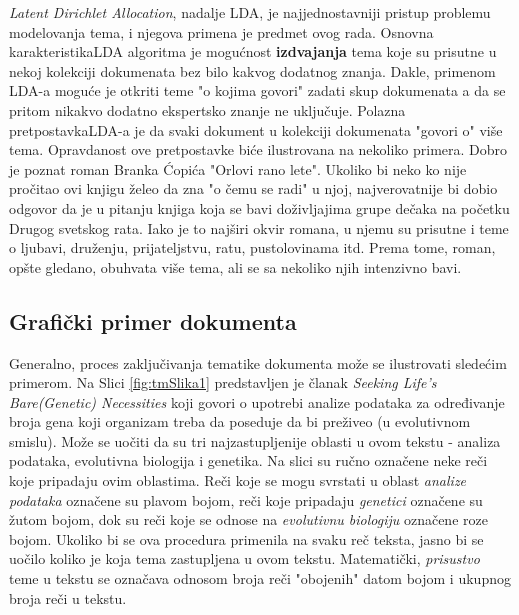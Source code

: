 \documentclass[12pt,a4paper]{article}
\begin{document}
\begin{multicols}{2}
{\lat \textit{Latent Dirichlet Allocation}}, nadalje {\lat LDA}, je najjednostavniji pristup problemu modelovanja tema, i njegova primena je predmet ovog rada.
Osnovna karakteristika{\lat LDA } algoritma je mogu\' cnost \textbf{izdvajanja} tema koje su prisutne u nekoj kolekciji dokumenata bez bilo kakvog dodatnog znanja. Dakle, primenom {\lat LDA}-a mogu\' ce je otkriti teme "o kojima govori" zadati skup dokumenata a da se pritom nikakvo dodatno ekspertsko znanje ne uklju\v cuje.
Polazna pretpostavka{\lat LDA}-a je da svaki dokument u kolekciji dokumenata "govori o" vi\v se tema. Opravdanost ove pretpostavke bi\' ce ilustrovana na nekoliko primera.
Dobro je poznat roman Branka \' Copi\' ca "Orlovi rano lete". Ukoliko bi neko ko nije pro\v citao ovi knjigu \v zeleo da zna "o \v cemu se radi" u njoj, najverovatnije bi dobio odgovor da je u pitanju knjiga koja se bavi do\v zivljajima grupe de\v caka na po\v cetku Drugog svetskog rata. Iako je to naj\v siri okvir romana, u njemu su prisutne i teme o ljubavi, dru\v zenju, prijateljstvu, ratu, pustolovinama itd. Prema tome, roman, op\v ste gledano, obuhvata vi\v se tema, ali se sa nekoliko njih intenzivno bavi.
\end{multicols}

\subsection{Grafi\v cki primer dokumenta}
Generalno, proces zaklju\v civanja tematike dokumenta mo\v ze se ilustrovati slede\' cim primerom.
Na Slici \ref{fig:tmSlika1} predstavljen je \v clanak {\lat \textit{Seeking Life's Bare(Genetic) Necessities}} koji govori o upotrebi analize podataka za određivanje broja gena koji organizam treba da poseduje da bi pre\v ziveo (u evolutivnom smislu). Mo\v ze se uo\v citi da su tri najzastupljenije oblasti u ovom tekstu - analiza podataka, evolutivna biologija i genetika. Na slici su ru\v cno ozna\v cene neke re\v ci koje pripadaju ovim oblastima. Re\v ci koje se mogu svrstati u oblast \textit{analize podataka} ozna\v cene su plavom bojom, re\v ci koje pripadaju \textit{genetici} ozna\v cene su \v zutom bojom, dok su re\v ci koje se odnose na \textit{evolutivnu biologiju} ozna\v cene roze bojom. Ukoliko bi se ova procedura primenila na svaku re\v c teksta, jasno bi se uo\v cilo koliko je koja tema zastupljena u ovom tekstu. Matemati\v cki, \textit{prisustvo} teme u tekstu se ozna\v cava odnosom broja re\v ci "obojenih" datom bojom i ukupnog broja re\v ci u tekstu.
\end{document}
